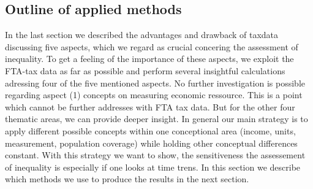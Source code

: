 \documentclass[twoside]{article}\usepackage[]{graphicx}\usepackage[]{color}
\begin{document}
\begin{multicols}{2}
\subsection{Outline of applied methods}


In the last section we described the advantages and drawback of taxdata discussing five aspects, which we regard as crucial concering the assessment of inequality. To get a feeling of the importance of these aspects, we exploit the FTA-tax data as far as possible and perform several insightful calculations adressing four of the five mentioned aspects. No further investigation is possible regarding aspect (1) concepts on measuring economic ressource. This is a point which cannot be further addresses with FTA tax data. But for the other four thematic areas, we can provide deeper insight. In general our main strategy is to apply different possible concepts within one conceptional area (income, units, measurement, population coverage) while holding other conceptual differences constant. With this strategy we want to show, the sensitiveness the assessement of inequality is especially if one looks at time trens.  In this section we  describe which methods we use to produce the results in the next section.








\end{multicols}
\end{document}
